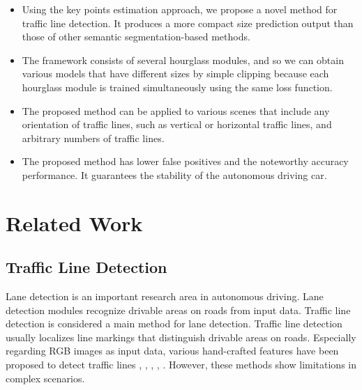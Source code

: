 \documentclass[journal]{IEEEtran}
\begin{document}
\begin{itemize}

\item Using the key points estimation approach, we propose a novel method for traffic line detection. It produces a more compact size prediction output than those of other semantic segmentation-based methods.

\item The framework consists of several hourglass modules, and so we can obtain various models that have different sizes by simple clipping because each hourglass module is trained simultaneously using the same loss function.

\item The proposed method can be applied to various scenes that include any orientation of traffic lines, such as vertical or horizontal traffic lines, and arbitrary numbers of traffic lines.

\item The proposed method has lower false positives and the noteworthy accuracy performance. It guarantees the stability of the autonomous driving car.

\end{itemize}






















\section{Related Work}

\subsection{Traffic Line Detection}
Lane detection is an important research area in autonomous driving. Lane detection modules recognize drivable areas on roads from input data. Traffic line detection is considered a main method for lane detection. Traffic line detection usually localizes line markings that distinguish drivable areas on roads. Especially regarding RGB images as input data, various hand-crafted features have been proposed to detect traffic lines \cite{deusch2012random}, \cite{yim2003three}, \cite{borkar2011novel}, \cite{8454897}, \cite{6719504}. However, these methods show limitations in complex scenarios.
\end{document}
